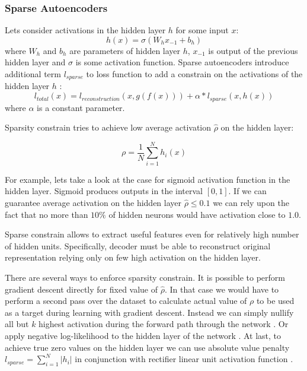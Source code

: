 \subsubsection{Sparse Autoencoders}\label{ch:sae}

Lets consider activations in the hidden layer $h$ for some input $x$:
\begin{equation}
  h(x) = \sigma(W_{h}x_{-1} + b_{h})
\end{equation}
where $W_h$ and $b_h$ are parameters of hidden layer $h$, $x_{-1}$ is output of the previous hidden layer and $\sigma$ is some activation function.
Sparse autoencoders introduce additional term $l_{sparse}$ to loss function to add a constrain on the activations of the hidden layer $h$ \cite{Ng2011}:
\begin{equation}
  l_{total}(x) = l_{reconstruction}(x, g(f(x))) + \alpha*l_{sparse}(x, h(x))
\end{equation}
where $\alpha$ is a constant parameter.

Sparsity constrain tries to achieve low average activation $\hat{\rho}$ on the hidden layer:

\begin{equation}\label{eq:avgh}
  \rho = \frac{1}{N} \sum_{i=1}^N h_i(x)
\end{equation}

For example, lets take a look at the case for sigmoid activation function in the hidden layer.
Sigmoid produces outputs in the interval $[0, 1]$. If we can guarantee average activation on the hidden layer $\hat{\rho} \leq 0.1$ we can rely upon the fact that no more than $10\%$ of hidden neurons would have activation close to $1.0$.

Sparse constrain allows to extract useful features even for relatively high number of hidden units. Specifically, decoder must be able to reconstruct original representation relying only on few high activation on the hidden layer.

There are several ways to enforce sparsity constrain.
It is possible to perform gradient descent directly for fixed value of $\hat{\rho}$. In that case we would have to perform a second pass over the dataset to calculate actual value of $\rho$ to be used as a target during learning with gradient descent. Instead we can simply nullify all but $k$ highest activation during the forward path through the network \cite{Kulkarni2015}.
Or apply negative log-likelihood to the hidden layer of the network \cite{Zhao2015}.
At last, to achieve true zero values on the hidden layer we can use absolute value penalty $l_{sparse}=\sum_{i=1}^N |h_i|$ in conjunction with rectifier linear unit activation function \cite{Glorot2011}.

